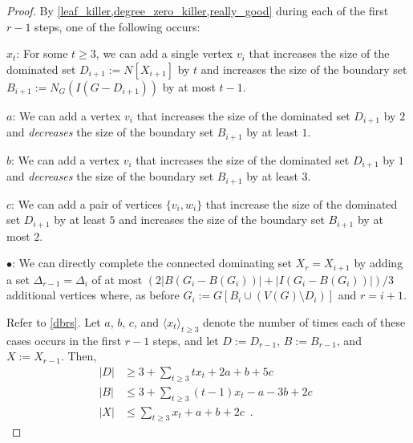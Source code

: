 \documentclass{article}
\theoremstyle{definition}
\begin{document}
\begin{proof}
  By \cref{leaf_killer,degree_zero_killer,really_good} during each of the first $r-1$ steps, one of the following occurs:
  \begin{compactitem}
    \item[$x_t$:] For some $t\ge 3$, we can add a single vertex $v_i$ that increases the size of the dominated set $D_{i+1}:=N[X_{i+1}]$ by $t$ and increases the size of the boundary set $B_{i+1}:=N_G(I(G-D_{i+1}))$ by at most $t-1$.
    \item[$a$:] We can add a vertex $v_i$ that increases the size of the dominated set $D_{i+1}$ by $2$ and \emph{decreases} the size of the boundary set $B_{i+1}$ by at least $1$.
    \item[$b$:] We can add a vertex $v_i$ that increases the size of the dominated set $D_{i+1}$ by $1$ and \emph{decreases} the size of the boundary set $B_{i+1}$ by at least $3$.
    \item[$c$:] We can add a pair of vertices $\{v_i,w_i\}$ that increase the size of the dominated set $D_{i+1}$ by at least $5$ and increases the size of the boundary set $B_{i+1}$ by at most $2$.
    \item[$\bullet$:] We can directly complete the connected dominating set $X_r=X_{i+1}$ by adding a set $\Delta_{r-1}=\Delta_i$ of at most $(2|B(G_{i}-B(G_i))|+|I(G_i-B(G_i))|)/3$ additional vertices where, as before $G_i:=G[B_i\cup (V(G)\setminus D_i)]$ and $r=i+1$.
  \end{compactitem}

  Refer to \cref{dbrs}. Let $a$, $b$, $c$, and $\langle x_t\rangle_{t\ge 3}$ denote the number of times each of these cases occurs in the first $r-1$ steps, and let $D:=D_{r-1}$, $B:=B_{r-1}$, and $X:=X_{r-1}$.  Then,
  \begin{align}
    |D| & \ge 3 + \sum_{t\ge 3}tx_t + 2a + b + 5c \label{dd_size} \\
    |B| & \le 3 + \sum_{t\ge 3}(t-1)x_t - a - 3b + 2c \enspace \label{bb_size} \\
    |X| & \le \sum_{t\ge 3}x_t + a + b + 2c \label{x_size} \enspace .
  \end{align}


\end{proof}
\end{document}
